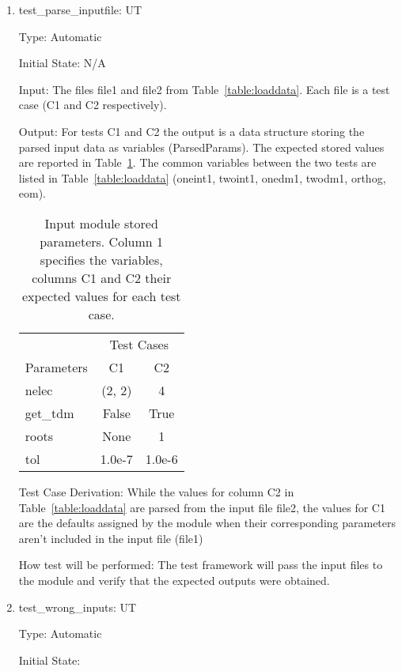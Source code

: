 \documentclass[12pt, titlepage]{article}
\newcounter{utnum} %
\begin{document}
\begin{enumerate}
	
	\item{test\_parse\_inputfile: UT\theutnum 
	\label{UT1}}
	
	Type: Automatic
	
	Initial State: N/A
	
	Input: The files file1 and file2 from Table~\ref{table:loaddata}. Each file 
	is a test case (C1 and C2 respectively).

	Output: For tests C1 and C2 the output is a data structure storing the 
	parsed input data as variables (ParsedParams). The expected stored values 
	are reported in Table~\ref{table:loadcases}. The common variables between 
	the two tests are listed in Table~\ref{table:loaddata} (oneint1, twoint1, 
	onedm1, 
	twodm1, orthog, eom).
	\begin{table}[h!]
		\centering
		\begin{tabular}{lcc}
			& \multicolumn{2}{c}{Test Cases} \\
			Parameters             &  C1  &  C2  \\
			nelec                  & (2, 2) & 4  \\
			get\_tdm                 &  False   &  True   \\
			roots                &  None  &  1\\
			tol& 1.0e-7& 1.0e-6\\  
		\end{tabular}
		\caption{Input module stored parameters. Column 1 
			specifies the variables, columns C1 and C2 their expected values 
			for each test case.}
		\label{table:loadcases}
	\end{table}
	
	Test Case Derivation: While the values for column C2 in 
	Table~\ref{table:loaddata} are parsed from the input file file2, the values 
	for C1 are the defaults assigned by the module when their corresponding 
	parameters aren't included in the input file (file1)
	
	How test will be performed: The test framework will pass the input files to 
	the module and verify that the expected outputs were obtained.
	
	\item{test\_wrong\_inputs:  UT\theutnum 
		\label{UT2}}
	
	Type: Automatic
	
	Initial State: 
	

\end{enumerate}
\end{document}

